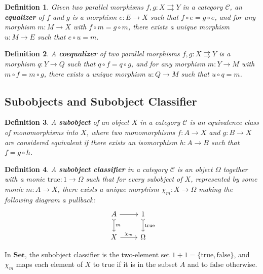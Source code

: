 \documentclass{article}
\newtheorem{definition}{Definition}[section]
\begin{document}
\begin{definition}
    Given two parallel morphisms $f, g \colon X \rightrightarrows Y$ in a category $\mathcal{C}$, an \textbf{equalizer} of $f$ and $g$ is a morphism $e \colon E \to X$ such that $f \circ e = g \circ e$, and for any morphism $m \colon M \to X$ with $f \circ m = g \circ m$, there exists a unique morphism $u \colon M \to E$ such that $e \circ u = m$.
\end{definition}

\begin{definition}
    A \textbf{coequalizer} of two parallel morphisms $f, g \colon X \rightrightarrows Y$ is a morphism $q \colon Y \to Q$ such that $q \circ f = q \circ g$, and for any morphism $m \colon Y \to M$ with $m \circ f = m \circ g$, there exists a unique morphism $u \colon Q \to M$ such that $u \circ q = m$.
\end{definition}

\subsection{Subobjects and Subobject Classifier}

\begin{definition}
    A \textbf{subobject} of an object $X$ in a category $\mathcal{C}$ is an equivalence class of monomorphisms into $X$, where two monomorphisms $f \colon A \to X$ and $g \colon B \to X$ are considered equivalent if there exists an isomorphism $h \colon A \to B$ such that $f = g \circ h$.
\end{definition}

\begin{definition}
    A \textbf{subobject classifier} in a category $\mathcal{C}$ is an object $\Omega$ together with a monic $\text{true} \colon 1 \to \Omega$ such that for every subobject of $X$, represented by some monic $m \colon A \to X$, there exists a unique morphism $\chi_m \colon X \to \Omega$ making the following diagram a pullback:
    \[
        \begin{tikzcd}
            A \arrow[r] \arrow[d, tail, "m"] & 1 \arrow[d, tail, "\text{true}"] \\
            X \arrow[r, "\chi_m"] & \Omega
        \end{tikzcd}
    \]
\end{definition}

In $\mathbf{Set}$, the subobject classifier is the two-element set $1 + 1 = \{\text{true}, \text{false}\}$, and $\chi_m$ maps each element of $X$ to $\text{true}$ if it is in the subset $A$ and to $\text{false}$ otherwise.
\end{document}
